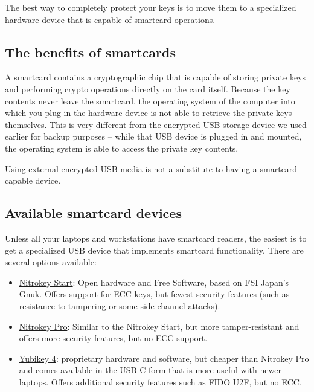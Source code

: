 \documentclass[a4paper,8pt,english]{sphinxmanual}
\begin{document}
The best way to completely protect your keys is to move them to a
specialized hardware device that is capable of smartcard operations.


\subsection{The benefits of smartcards}
\label{process/maintainer-pgp-guide:the-benefits-of-smartcards}
A smartcard contains a cryptographic chip that is capable of storing
private keys and performing crypto operations directly on the card
itself. Because the key contents never leave the smartcard, the
operating system of the computer into which you plug in the hardware
device is not able to retrieve the private keys themselves. This is very
different from the encrypted USB storage device we used earlier for
backup purposes -- while that USB device is plugged in and mounted, the
operating system is able to access the private key contents.

Using external encrypted USB media is not a substitute to having a
smartcard-capable device.


\subsection{Available smartcard devices}
\label{process/maintainer-pgp-guide:available-smartcard-devices}
Unless all your laptops and workstations have smartcard readers, the
easiest is to get a specialized USB device that implements smartcard
functionality.  There are several options available:
\begin{itemize}
\item {} 
\href{https://shop.nitrokey.com/shop/product/nitrokey-start-6}{Nitrokey Start}: Open hardware and Free Software, based on FSI
Japan's \href{http://www.fsij.org/doc-gnuk/}{Gnuk}. Offers support for ECC keys, but fewest security
features (such as resistance to tampering or some side-channel
attacks).

\item {} 
\href{https://shop.nitrokey.com/shop/product/nitrokey-pro-3}{Nitrokey Pro}: Similar to the Nitrokey Start, but more
tamper-resistant and offers more security features, but no ECC
support.

\item {} 
\href{https://www.yubico.com/product/yubikey-4-series/}{Yubikey 4}: proprietary hardware and software, but cheaper than
Nitrokey Pro and comes available in the USB-C form that is more useful
with newer laptops. Offers additional security features such as FIDO
U2F, but no ECC.

\end{itemize}
\end{document}
